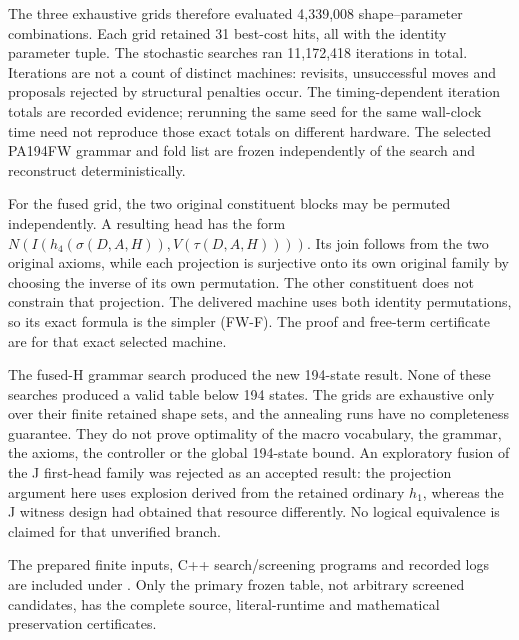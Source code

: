 The three exhaustive grids therefore evaluated 4,339,008
shape--parameter combinations.  Each grid retained 31 best-cost hits,
all with the identity parameter tuple.  The stochastic searches ran
11,172,418 iterations in total.  Iterations are not a count of distinct
machines: revisits, unsuccessful moves and proposals rejected by
structural penalties occur.  The timing-dependent iteration totals are
recorded evidence; rerunning the same seed for the same wall-clock time
need not reproduce those exact totals on different hardware.  The
selected PA194FW grammar and fold list are frozen independently of the
search and reconstruct deterministically.

For the fused grid, the two original constituent blocks may be permuted
independently.  A resulting head has the form
$N(I(h_4(\sigma(D,A,H)),V(\tau(D,A,H))))$.  Its join follows from the
two original axioms, while each projection is surjective onto its own
original family by choosing the inverse of its own permutation.  The
other constituent does not constrain that projection.  The delivered
machine uses both identity permutations, so its exact formula is the
simpler (FW-F).  The proof and free-term certificate are for that exact
selected machine.

The fused-H grammar search produced the new 194-state result.  None of
these searches produced a valid table below 194 states.  The grids are
exhaustive only over their finite retained shape sets, and the annealing
runs have no completeness guarantee.  They do not prove optimality of
the macro vocabulary, the grammar, the axioms, the controller or the
global 194-state bound.  An exploratory fusion of the J first-head
family was rejected as an accepted result: the projection argument here
uses explosion derived from the retained ordinary $h_1$, whereas the
J witness design had obtained that resource differently.  No logical
equivalence is claimed for that unverified branch.

The prepared finite inputs, C++ search/screening programs and recorded
logs are included under .  Only the primary
frozen table, not arbitrary screened candidates, has the complete
source, literal-runtime and mathematical preservation certificates.
